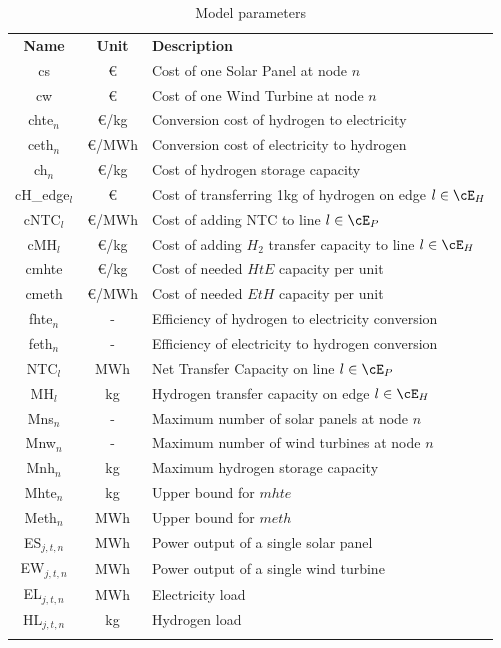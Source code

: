 \documentclass[smallextended,natbib]{svjour3}       %
\numberwithin{theorem}{section}
\begin{document}
\begin{table}
\caption{Model parameters}
  \label{table_param}
\begin{tabularx}{\textwidth}{ccl}
  \hline\noalign{\smallskip}
    \textbf{Name} & \textbf{Unit} & \textbf{Description}\\
  \noalign{\smallskip}\hline\noalign{\smallskip}
    cs & \euro& Cost of one Solar Panel at node $n$\\
    cw & \euro & Cost of one Wind Turbine at node $n$\\
    chte$_n$ & \euro/kg & Conversion cost of hydrogen to electricity \\
    ceth$_n$ & \euro/MWh & Conversion cost of electricity to hydrogen \\
    ch$_n$ & \euro/kg & Cost of hydrogen storage capacity\\
    cH\_edge$_l$ & \euro & Cost of transferring 1kg of hydrogen on edge $l\in\cE_H$\\
    cNTC$_l$ & \euro/MWh & Cost of adding NTC to line $l\in\cE_P$\\
    cMH$_l$ &\euro/kg& Cost of adding $H_2$ transfer capacity to line $l\in\cE_H$\\
    cmhte & \euro/kg & Cost of needed $HtE$ capacity per unit\\
    cmeth & \euro/MWh&Cost of needed $EtH$ capacity per unit\\
  \noalign{\smallskip}\hline\noalign{\smallskip}
    fhte$_n$ & - & Efficiency of hydrogen to electricity conversion \\ 
    feth$_n$ & - & Efficiency of electricity to hydrogen conversion \\
    NTC$_l$ & MWh & Net Transfer Capacity on line $l\in\cE_P$\\
    MH$_l$ & kg &  Hydrogen transfer capacity on edge $l\in\cE_H$\\
  \noalign{\smallskip}\hline\noalign{\smallskip}
    Mns$_n$ & - & Maximum number of solar panels at node $n$\\ 
    Mnw$_n$ & - & Maximum number of wind turbines at node $n$  \\ 
    Mnh$_n$ & kg & Maximum hydrogen storage capacity \\
    Mhte$_n$ & kg & Upper bound for \(mhte\) \\ 
    Meth$_n$ & MWh & Upper bound for \(meth\) \\
  \noalign{\smallskip}\hline\noalign{\smallskip}
    ES$_{j,t,n}$ & MWh & Power output of a single solar panel\\
    EW$_{j,t,n}$ & MWh & Power output of a single wind turbine \\
    EL$_{j,t,n}$ & MWh & Electricity load \\
    HL$_{j,t,n}$ & kg & Hydrogen load\\
    \noalign{\smallskip}\hline
\end{tabularx}
\end{table}
\end{document}
